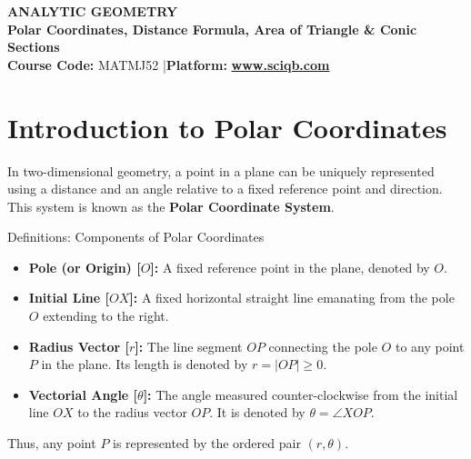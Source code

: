 \documentclass[11pt,a4paper]{article}
\begin{document}
\begin{center}
    \begin{tcolorbox}[sharp corners, boxrule=1.5pt]
        \begin{center}
            {\Large \bfseries \color{primarynavy} ANALYTIC GEOMETRY}\\[4pt]
            {\large \bfseries \color{secondaryteal} Polar Coordinates, Distance Formula, Area of Triangle \& Conic Sections}\\[6pt]
            {\small \textbf{Course Code:} MATMJ52 \quad|\quad \textbf{Platform:} \href{https://www.sciqb.com}{\color{accentblue}\textbf{www.sciqb.com}}}
        \end{center}
    \end{tcolorbox}
\end{center}

\vspace{0.3cm}

\section{Introduction to Polar Coordinates}

In two-dimensional geometry, a point in a plane can be uniquely represented using a distance and an angle relative to a fixed reference point and direction. This system is known as the \textbf{Polar Coordinate System}.

\begin{defbox}{Definitions: Components of Polar Coordinates}
\begin{itemize}
    \item \textbf{Pole (or Origin) [$O$]:} A fixed reference point in the plane, denoted by $O$.
    \item \textbf{Initial Line [$OX$]:} A fixed horizontal straight line emanating from the pole $O$ extending to the right.
    \item \textbf{Radius Vector [$r$]:} The line segment $OP$ connecting the pole $O$ to any point $P$ in the plane. Its length is denoted by $r = |OP| \ge 0$.
    \item \textbf{Vectorial Angle [$\theta$]:} The angle measured counter-clockwise from the initial line $OX$ to the radius vector $OP$. It is denoted by $\theta = \angle XOP$.
\end{itemize}
Thus, any point $P$ is represented by the ordered pair $(r, \theta)$.
\end{defbox}
\end{document}

